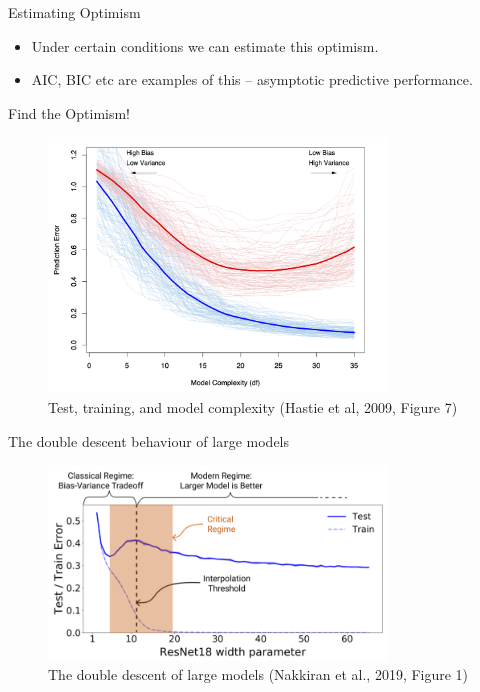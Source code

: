 \documentclass[10pt,handout]{beamer}
\begin{document}
\begin{frame}{Estimating Optimism}

\begin{itemize}
\item Under certain conditions we can estimate this optimism.
\item AIC, BIC etc are examples of this -- asymptotic predictive performance.
\end{itemize}



\end{frame}


\begin{frame}{Find the Optimism!}

\begin{figure}[h]
\caption{Test, training, and model complexity (Hastie et al, 2009, Figure 7)}
\centering
\includegraphics[width=0.8\textwidth]{figs/ESL_7_1.png}
\end{figure}


\end{frame}



\begin{frame}{The double descent behaviour of large models}

\begin{figure}[h]
\caption{The double descent of large models (Nakkiran et al., 2019, Figure 1)}
\centering
\includegraphics[width=0.8\textwidth]{figs/Nakkiran_et_al_2019.png}
\end{figure}



\end{frame}
\end{document}
